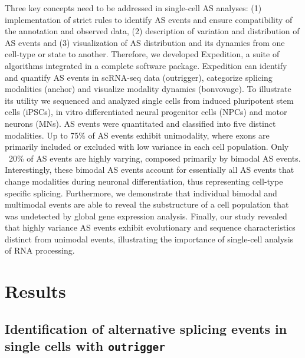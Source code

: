 Three key concepts need to be addressed in single-cell AS analyses: (1) implementation of strict rules to identify AS events and ensure compatibility of the annotation and observed data, (2) description of variation and distribution of AS events and (3) visualization of AS distribution and its dynamics from one cell-type or state to another. Therefore, we developed Expedition, a suite of algorithms integrated in a complete software package. Expedition can identify and quantify AS events in scRNA-seq data (outrigger), categorize splicing modalities (anchor) and visualize modality dynamics (bonvovage). To illustrate its utility we sequenced and analyzed single cells from induced pluripotent stem cells (iPSCs), in vitro differentiated neural progenitor cells (NPCs) and motor neurons (MNs). AS events were quantitated and classified into five distinct modalities. Up to 75\% of AS events exhibit unimodality, where exons are primarily included or excluded with low variance in each cell population. Only ~20\% of AS events are highly varying, composed primarily by bimodal AS events. Interestingly, these bimodal AS events account for essentially all AS events that change modalities during neuronal differentiation, thus representing cell-type specific splicing. Furthermore, we demonstrate that individual bimodal and multimodal events are able to reveal the substructure of a cell population that was undetected by global gene expression analysis. Finally, our study revealed that highly variance AS events exhibit evolutionary and sequence characteristics distinct from unimodal events, illustrating the importance of single-cell analysis of RNA processing.

\section{Results}
\subsection{Identification of alternative splicing events in single cells with \texttt{outrigger}}

